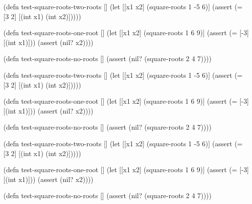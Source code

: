 \ifnarrow

\begin{english}
  \begin{clojure}
(defn test-square-roots-two-roots []
  (let [[x1 x2] (square-roots 1 -5 6)]
    (assert
      (= [3 2]
         [(int x1) (int x2)]))))

(defn test-square-roots-one-root []
  (let [[x1 x2] (square-roots 1 6 9)]
    (assert (= [-3] [(int x1)]))
    (assert (nil? x2))))

(defn test-square-roots-no-roots []
  (assert (nil? (square-roots 2 4 7))))
  \end{clojure}
\end{english}

\else

\ifafive

\begin{english}
  \begin{clojure}
(defn test-square-roots-two-roots []
  (let [[x1 x2] (square-roots 1 -5 6)]
    (assert (= [3 2] [(int x1) (int x2)]))))
  \end{clojure}
\end{english}

\pagebreakafive

\begin{english}
  \begin{clojure}
(defn test-square-roots-one-root []
  (let [[x1 x2] (square-roots 1 6 9)]
    (assert (= [-3] [(int x1)]))
    (assert (nil? x2))))

(defn test-square-roots-no-roots []
  (assert (nil? (square-roots 2 4 7))))
  \end{clojure}
\end{english}

\else

\begin{english}
  \begin{clojure}
(defn test-square-roots-two-roots []
  (let [[x1 x2] (square-roots 1 -5 6)]
    (assert (= [3 2] [(int x1) (int x2)]))))

(defn test-square-roots-one-root []
  (let [[x1 x2] (square-roots 1 6 9)]
    (assert (= [-3] [(int x1)]))
    (assert (nil? x2))))

(defn test-square-roots-no-roots []
  (assert (nil? (square-roots 2 4 7))))
  \end{clojure}
\end{english}

\fi

\fi

